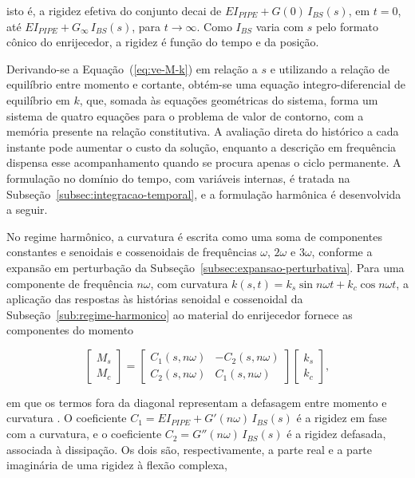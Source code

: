 \documentclass[arial,centeredequations,english,brazilian,oneside,section=TITLE]{ifes8}
\begin{document}
isto é, a rigidez efetiva do conjunto decai de $EI_{PIPE} + G(0)\,I_{BS}(s)$, em $t = 0$,
até $EI_{PIPE} + G_{\infty}\,I_{BS}(s)$, para $t \to \infty$. Como $I_{BS}$ varia com $s$
pelo formato cônico do enrijecedor, a rigidez é função do tempo e da posição.

Derivando-se a Equação~(\ref{eq:ve-M-k}) em relação a $s$ e utilizando a relação de
equilíbrio entre momento e cortante, obtém-se uma equação integro-diferencial de
equilíbrio em $k$, que, somada às equações geométricas do sistema, forma um sistema de
quatro equações para o problema de valor de contorno, com a memória presente na
relação constitutiva. A avaliação direta do histórico a cada instante pode
aumentar o custo da solução, enquanto a descrição em frequência dispensa
esse acompanhamento quando se procura apenas o ciclo permanente.
A formulação no domínio do tempo, com
variáveis internas, é tratada na Subseção~\ref{subsec:integracao-temporal}, e a
formulação harmônica é desenvolvida a seguir.

No regime harmônico, a curvatura é escrita como uma soma de componentes constantes e
senoidais e cossenoidais de frequências $\omega$, $2\omega$ e $3\omega$, conforme a
expansão em perturbação da Subseção~\ref{subsec:expansao-perturbativa}. Para uma componente de
frequência $n\omega$, com curvatura $k(s,t) = k_s\sin n\omega t + k_c\cos n\omega t$, a
aplicação das respostas às histórias senoidal e cossenoidal da
Subseção~\ref{sub:regime-harmonico} ao material do enrijecedor fornece as componentes do
momento

\begin{equation}
  \label{eq:ve-rigidez-bloco}
  \begin{bmatrix} M_s \\ M_c \end{bmatrix}
  =
  \begin{bmatrix}
    C_1(s, n\omega) & -C_2(s, n\omega) \\
    C_2(s, n\omega) & C_1(s, n\omega)
  \end{bmatrix}
  \begin{bmatrix} k_s \\ k_c \end{bmatrix},
\end{equation}

em que os termos fora da diagonal representam a defasagem entre momento e curvatura
\cite{Caire2011}. O
coeficiente $C_1 = EI_{PIPE} + G'(n\omega)\,I_{BS}(s)$ é a rigidez em fase com a
curvatura, e o coeficiente $C_2 = G''(n\omega)\,I_{BS}(s)$ é a rigidez defasada, associada à
dissipação. Os dois são, respectivamente, a parte real e a parte imaginária de uma rigidez
à flexão complexa,
\end{document}
